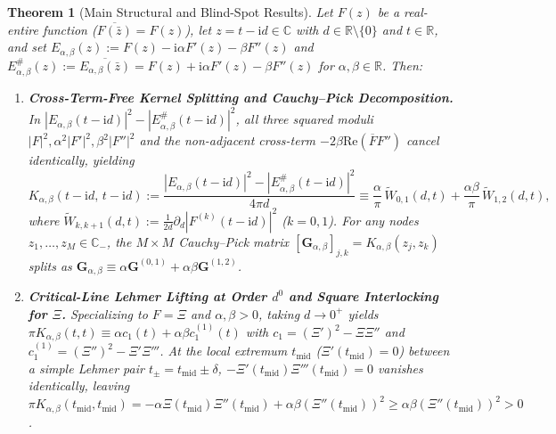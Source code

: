 \documentclass[11pt,reqno]{amsart}
\newtheorem{theorem}{Theorem}[section]
\theoremstyle{definition}
\theoremstyle{remark}
\numberwithin{equation}{section}
\newcommand{\R}{\mathbb{R}}
\newcommand{\C}{\mathbb{C}}
\newcommand{\ii}{\mathrm{i}}
\newcommand{\Rea}{\mathrm{Re}}
\begin{document}
\begin{theorem}[Main Structural and Blind-Spot Results]\label{thm:main}
Let $F(z)$ be a real-entire function ($\overline{F(\bar{z})} = F(z)$), let $z = t - \ii d \in \C$ with $d \in \R \setminus \{0\}$ and $t \in \R$, and set $E_{\alpha,\beta}(z) := F(z) - \ii\alpha F'(z) - \beta F''(z)$ and $E_{\alpha,\beta}^\#(z) := \overline{E_{\alpha,\beta}(\bar{z})} = F(z) + \ii\alpha F'(z) - \beta F''(z)$ for $\alpha, \beta \in \R$. Then:
\begin{enumerate}[label=\textup{(\roman*)},leftmargin=2.2em]
\item \textbf{Cross-Term-Free Kernel Splitting and Cauchy--Pick Decomposition.} In $|E_{\alpha,\beta}(t-\ii d)|^2 - |E_{\alpha,\beta}^\#(t-\ii d)|^2$, all three squared moduli $|F|^2, \alpha^2|F'|^2, \beta^2|F''|^2$ and the non-adjacent cross-term $-2\beta\Rea(\overline{F}F'')$ cancel identically, yielding
\begin{equation}\label{eq:intro_second_order_split}
K_{\alpha,\beta}(t - \ii d,\, t - \ii d) := \frac{|E_{\alpha,\beta}(t - \ii d)|^2 - |E_{\alpha,\beta}^\#(t - \ii d)|^2}{4\pi d} \equiv \frac{\alpha}{\pi}\,\widetilde{W}_{0,1}(d,t) + \frac{\alpha\beta}{\pi}\,\widetilde{W}_{1,2}(d,t),
\end{equation}
where $\widetilde{W}_{k,k+1}(d,t) := \frac{1}{2d}\partial_d|F^{(k)}(t-\ii d)|^2$ ($k = 0, 1$). For any nodes $z_1, \dots, z_M \in \C_-$, the $M \times M$ Cauchy--Pick matrix $[\mathbf{G}_{\alpha,\beta}]_{j,k} = K_{\alpha,\beta}(z_j, z_k)$ splits as $\mathbf{G}_{\alpha,\beta} \equiv \alpha\mathbf{G}^{(0,1)} + \alpha\beta\mathbf{G}^{(1,2)}$.
\item \textbf{Critical-Line Lehmer Lifting at Order $d^0$ and Square Interlocking for $\Xi$.} Specializing to $F = \Xi$ and $\alpha, \beta > 0$, taking $d \to 0^+$ yields $\pi K_{\alpha,\beta}(t,t) \equiv \alpha c_1(t) + \alpha\beta c_1^{(1)}(t)$ with $c_1 = (\Xi')^2 - \Xi\Xi''$ and $c_1^{(1)} = (\Xi'')^2 - \Xi'\Xi'''$. At the local extremum $t_{\mathrm{mid}}$ ($\Xi'(t_{\mathrm{mid}}) = 0$) between a simple Lehmer pair $t_\pm = t_{\mathrm{mid}} \pm \delta$, $-\Xi'(t_{\mathrm{mid}})\Xi'''(t_{\mathrm{mid}}) = 0$ vanishes identically, leaving $\pi K_{\alpha,\beta}(t_{\mathrm{mid}}, t_{\mathrm{mid}}) = -\alpha\Xi(t_{\mathrm{mid}})\Xi''(t_{\mathrm{mid}}) + \alpha\beta(\Xi''(t_{\mathrm{mid}}))^2 \ge \alpha\beta(\Xi''(t_{\mathrm{mid}}))^2 > 0$.

\end{enumerate}
\end{theorem}
\end{document}
